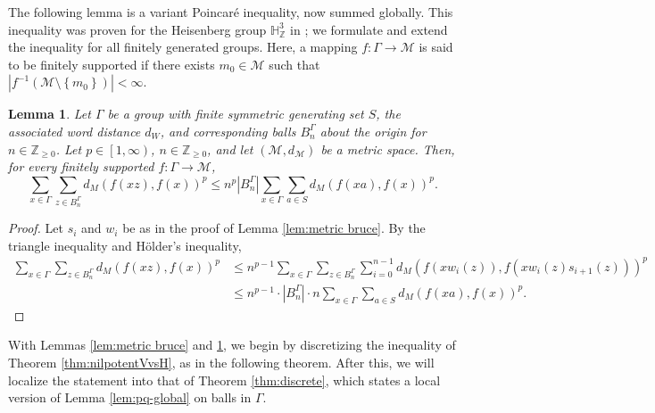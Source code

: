 \documentclass[11pt,reqno]{amsart}
\newtheorem{lemma}[theorem]{Lemma}
\newcommand{\1}{\mathbf 1}
\begin{document}
The following lemma is a variant Poincar\'e inequality, now summed globally. This inequality was proven for the Heisenberg group $\mathbb{H}^3_\mathbb{Z}$ in \cite[Lemma 3.4]{lafforgue2014vertical}; we formulate and extend the inequality for all finitely generated groups. Here, a mapping $f:\Gamma\to \mathcal{M}$ is said to be finitely supported if there exists $m_0\in \mathcal{M}$ such that $\left|f^{-1}\left(\mathcal{M}\setminus\left\{m_0\right\}\right)\right|<\infty$.


\begin{lemma}\label{lem:global poincare-simple} Let $\Gamma$ be a group with finite symmetric generating set $S$, the associated word distance $d_W$, and corresponding balls $B_n^\Gamma$ about the origin for $n\in \mathbb{Z}_{\ge 0}$. Let $p\in \left[1,\infty\right)$, $n\in \mathbb{Z}_{\ge 0}$, and let $\left(\mathcal{M},d_\mathcal{M}\right)$ be a metric space. Then, for every finitely supported $f:\Gamma\to \mathcal{M}$,
\[
\sum_{x\in \Gamma}\sum_{z\in B^\Gamma_n} d_M\left(f\left(xz\right),f\left(x\right)\right)^p\le n^{p}\left|B^\Gamma_n\right| \sum_{x\in \Gamma} \sum_{a\in S}d_M\left(f\left(xa\right),f\left(x\right)\right)^p.
\]
\end{lemma}

\begin{proof}
Let $s_i$ and $w_i$ be as in the proof of Lemma \ref{lem:metric bruce}. By the triangle inequality and H\"older's inequality,
\begin{align*}
\sum_{x\in \Gamma}\sum_{z\in B^\Gamma_n}d_M\left(f\left(xz\right),f\left(x\right)\right)^p&\le n^{p-1}\sum_{x\in \Gamma}\sum_{z\in B^\Gamma_n}\sum_{i=0}^{n-1} d_M\left(f\left(xw_{i}\left(z\right)\right),f\left(xw_{i}\left(z\right)s_{i+1}\left(z\right)\right)\right)^p\\
&\le n^{p-1}\cdot \left|B^\Gamma_n\right|\cdot n\sum_{x\in \Gamma} \sum_{a\in S}d_M\left(f\left(xa\right),f\left(x\right)\right)^p.
\end{align*}
\end{proof}


With Lemmas \ref{lem:metric bruce} and \ref{lem:global poincare-simple}, we begin by discretizing the inequality of Theorem \ref{thm:nilpotentVvsH}, as in the following theorem. After this, we will localize the statement into that of Theorem \ref{thm:discrete}, which states a local version of Lemma \ref{lem:pq-global} on balls in $\Gamma$.
\end{document}
